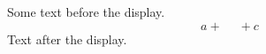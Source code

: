 \documentclass[12pt]{article}
\begin{document}
Some text before the display.
\[ a + \phantom{bbb} + c \]
Text after the display.
\end{document}
